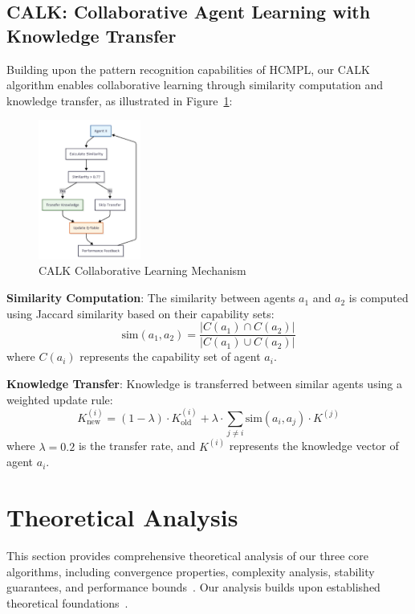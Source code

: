 \documentclass[conference]{IEEEtran}
\begin{document}
\subsection{CALK: Collaborative Agent Learning with Knowledge Transfer}

Building upon the pattern recognition capabilities of HCMPL, our CALK algorithm enables collaborative learning through similarity computation and knowledge transfer, as illustrated in Figure~\ref{fig:calk}:

\begin{figure}[htbp]
\centering
\includegraphics[width=0.3\textwidth]{images/crl_learning_mechanism.png}
\caption{CALK Collaborative Learning Mechanism}
\label{fig:calk}
\end{figure}

\textbf{Similarity Computation}: The similarity between agents $a_1$ and $a_2$ is computed using Jaccard similarity based on their capability sets:
\begin{equation}
\text{sim}(a_1, a_2) = \frac{|C(a_1) \cap C(a_2)|}{|C(a_1) \cup C(a_2)|}
\end{equation}
where $C(a_i)$ represents the capability set of agent $a_i$.

\textbf{Knowledge Transfer}: Knowledge is transferred between similar agents using a weighted update rule:
\begin{equation}
K_{\text{new}}^{(i)} = (1-\lambda) \cdot K_{\text{old}}^{(i)} + \lambda \cdot \sum_{j \neq i} \text{sim}(a_i, a_j) \cdot K^{(j)}
\end{equation}
where $\lambda = 0.2$ is the transfer rate, and $K^{(i)}$ represents the knowledge vector of agent $a_i$.

\section{Theoretical Analysis}

This section provides comprehensive theoretical analysis of our three core algorithms, including convergence properties, complexity analysis, stability guarantees, and performance bounds~\cite{sutton2018reinforcement,vaswani2017attention,cormen2009introduction}. Our analysis builds upon established theoretical foundations~\cite{skiena2008algorithm,sedgewick2011algorithms}.
\end{document}

